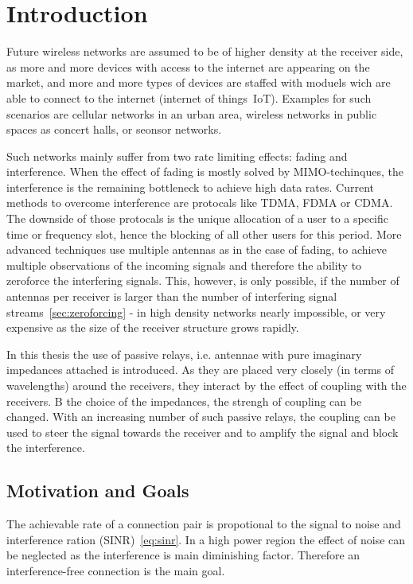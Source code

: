 \chapter{Introduction}
\label{sec:introduction}

Future wireless networks are assumed to be of higher density at the receiver side, as more and more devices with access to the internet are appearing on the market, and more and more types of devices are staffed with moduels wich are able to connect to the internet (internet of things~IoT).
Examples for such scenarios are cellular networks in an urban area, wireless networks in public spaces as concert halls, or seonsor networks.

Such networks mainly suffer from two rate limiting  effects: fading and interference.
When the effect of fading is mostly solved by MIMO-techinques, the interference is the remaining bottleneck to achieve high data rates.
Current methods to overcome interference are protocals like TDMA, FDMA or CDMA.
The downside of those protocals is the unique allocation of a user to a specific time or frequency slot, hence the blocking of all other users for this period.
More advanced techniques use multiple antennas as in the case of fading, to achieve multiple observations of the incoming signals and therefore the ability to zeroforce the interfering signals.
This, however, is only possible, if the number of antennas per receiver is larger than the number of interfering signal streams~\ref{sec:zeroforcing}
 - in high density networks nearly impossible, or very expensive as the size of the receiver structure grows rapidly.

In this thesis the use of passive relays, i.e. antennae with pure imaginary impedances attached is introduced.
As they are placed very closely (in terms of wavelengths) around the receivers, they interact by the effect of coupling with the receivers.
B the choice of the impedances, the strengh of coupling can be changed.
With an increasing number of such passive relays, the coupling can be used to steer the signal towards the receiver and to amplify the signal and block the interference.

\section{Motivation and Goals}
\label{sec:motivation}

The achievable rate of a connection pair is propotional to the signal to noise and interference ration (SINR)~\eqref{eq:sinr}.
In a high power region the effect of noise can be neglected as the interference is main diminishing factor.
Therefore an interference-free connection is the main goal.

